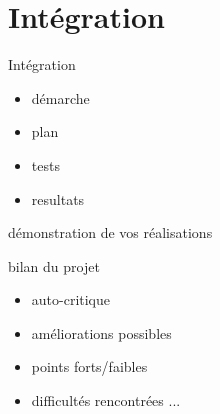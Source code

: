 \documentclass{beamer}
\begin{document}
\section{Intégration}
	\begin{frame}
		Intégration
		\begin{itemize}
			\item démarche
			\item plan
			\item tests
			\item resultats
		\end{itemize}
	\end{frame}

	\begin{frame}
		démonstration de vos réalisations
	\end{frame}

	\begin{frame}
		bilan du projet
		\begin{itemize}
			\item auto-critique
			\item améliorations possibles
			\item points forts/faibles
			\item difficultés rencontrées ...
		\end{itemize}
	\end{frame}
\end{document}
